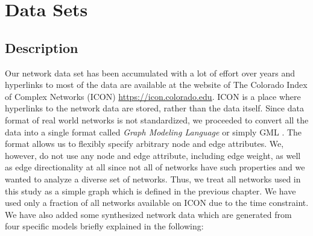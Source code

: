 \documentclass[..]{revtex4}
\begin{document}
\newpage
\section{Data Sets}
	\subsection{Description}	
	Our network data set has been accumulated with a lot of effort over years and hyperlinks to most of the data are available at the website of The Colorado Index of Complex Networks (ICON) \url{https://icon.colorado.edu}. ICON is a place where hyperlinks to the network data are stored, rather than the data itself.  
	Since data format of real world networks is not standardized, we proceeded to convert all the data into a single format called \textit{Graph Modeling Language} or simply GML \cite{GML}. The format allows us to flexibly specify arbitrary node and edge attributes. We, however, do not use any node and edge attribute, including edge weight, as well as edge directionality at all since not all of networks have such properties and we wanted to analyze a diverse set of networks. Thus, we treat all networks used in this study as a simple graph which is defined in the previous chapter. We have used only a fraction of all networks available on ICON due to the time constraint. We have also added some synthesized network data which are generated from four specific models briefly explained in the following:
	 
\end{document}
